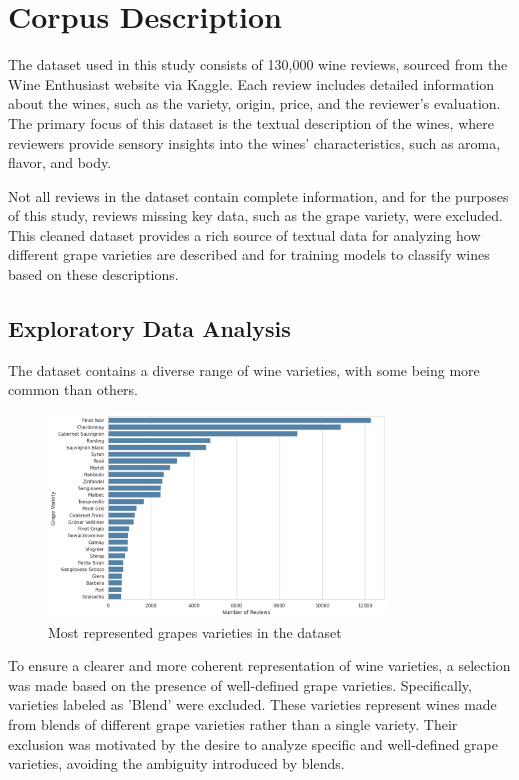 \section{Corpus Description} 
The dataset used in this study consists of 130,000 wine 
reviews, sourced from the Wine Enthusiast website 
via Kaggle. Each review includes detailed information 
about the wines, such as the variety, origin, price, 
and the reviewer's evaluation. The primary focus of 
this dataset is the textual description of the wines, 
where reviewers provide sensory insights into the 
wines’ characteristics, such as aroma, flavor, and body.

Not all reviews in the dataset contain complete 
information, and for the purposes of this study, 
reviews missing key data, such as the grape variety, 
were excluded. This cleaned dataset provides a rich 
source of textual data for analyzing how different 
grape varieties are described and for training models 
to classify wines based on these descriptions.

\subsection{Exploratory Data Analysis}
The dataset contains a diverse range of wine varieties, 
with some being more common than others.
\begin{figure}
    \centering
    \includegraphics[width=0.8\textwidth]{images/bar_plot_variety_reviews_distribution.png}
    \caption{Most represented grapes varieties in the dataset}
    \label{fig:grape_variety_distribution}
\end{figure}

To ensure a clearer and more coherent representation 
of wine varieties, a selection was made based on the 
presence of well-defined grape varieties. 
Specifically, varieties labeled as 'Blend' were 
excluded. These varieties represent wines made from 
blends of different grape varieties rather than a 
single variety. Their exclusion was motivated by the 
desire to analyze specific and well-defined grape 
varieties, avoiding the ambiguity introduced by blends.


